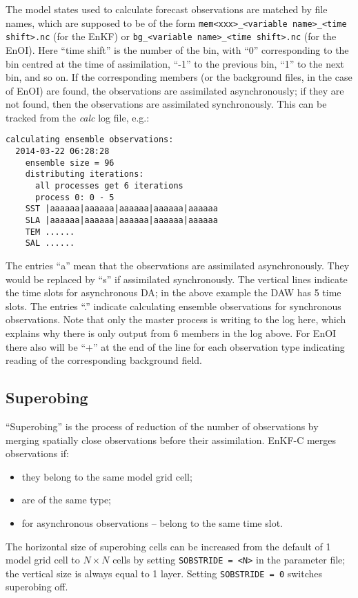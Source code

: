 \documentclass[11pt]{report}
\begin{document}
The model states used to calculate forecast observations are matched by file names, which are supposed to be of the form \verb|mem<xxx>_<variable name>_<time shift>.nc| (for the EnKF) or \verb|bg_<variable name>_<time shift>.nc| (for the EnOI).
Here ``time shift'' is the number of the bin, with ``0'' corresponding to the bin centred at the time of assimilation, ``-1'' to the previous bin, ``1'' to the next bin, and so on.
If the corresponding members (or the background files, in the case of EnOI) are found, the observations are assimilated asynchronously; if they are not found, then the observations are assimilated synchronously.
This can be tracked from the \emph{calc} log file, e.g.:
\begin{Verbatim}[frame=single,fontsize=\footnotesize]
  calculating ensemble observations:
  2014-03-22 06:28:28
    ensemble size = 96
    distributing iterations:
      all processes get 6 iterations
      process 0: 0 - 5
    SST |aaaaaa|aaaaaa|aaaaaa|aaaaaa|aaaaaa
    SLA |aaaaaa|aaaaaa|aaaaaa|aaaaaa|aaaaaa
    TEM ......
    SAL ......
\end{Verbatim}
The entries ``a'' mean that the observations are assimilated asynchronously.
They would be replaced by ``s'' if assimilated synchronously.
The vertical lines indicate the time slots for asynchronous DA; in the above example the DAW has 5 time slots.
The entries ``.'' indicate calculating ensemble observations for synchronous observations.
Note that only the master process is writing to the log here, which explains why there is only output from 6 members in the log above.
For EnOI there also will be ``+'' at the end of the line for each observation type indicating reading of the corresponding background field.

\subsection{Superobing}

``Superobing'' is the process of reduction of the number of observations by merging spatially close observations before their assimilation.
EnKF-C merges observations if:
\begin{itemize}
\item they belong to the same model grid cell;
\item are of the same type;
\item for asynchronous observations -- belong to the same time slot.
\end{itemize}
The horizontal size of superobing cells can be increased from the default of 1 model grid cell to $N \times N$ cells by setting \verb|SOBSTRIDE = <N>| in the parameter file; the vertical size is always equal to 1 layer.
Setting \verb|SOBSTRIDE = 0| switches superobing off.
\end{document}

